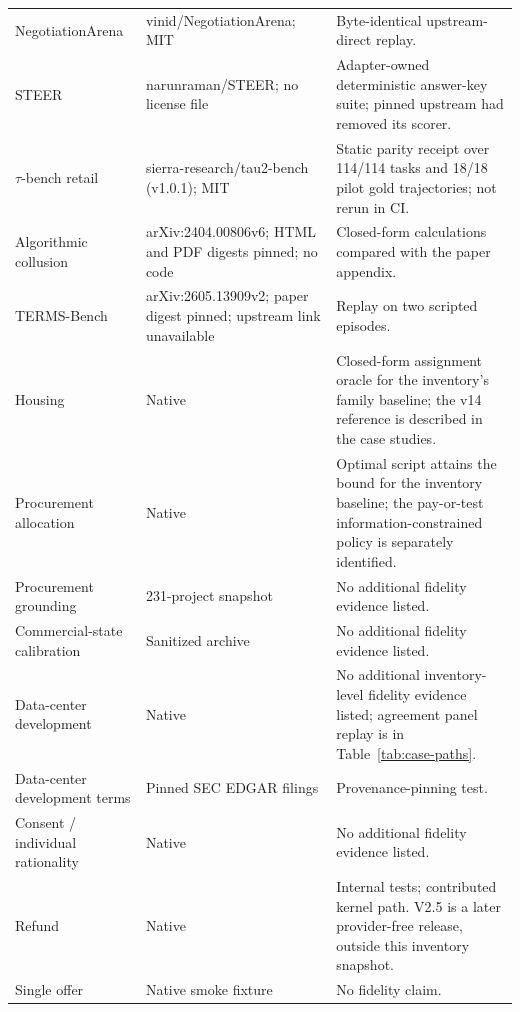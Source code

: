\begin{longtable}{@{}P{1.34in}P{2.22in}P{2.96in}@{}}
NegotiationArena \citep{bianchi2024negotiationarena} & vinid/NegotiationArena\newline{}; MIT & Byte-identical upstream-direct replay.\\
STEER \citep{raman2024steer} & narunraman/STEER\newline{}; no license file & Adapter-owned deterministic answer-key suite; pinned upstream had removed its scorer.\\
$\tau$-bench retail \citep{barres2025tau2} & sierra-research/tau2-bench\newline{} (v1.0.1); MIT & Static parity receipt over 114/114 tasks and 18/18 pilot gold trajectories; not rerun in CI.\\
Algorithmic collusion \citep{fish2024collusion} & arXiv:2404.00806v6; HTML and PDF digests pinned; no code & Closed-form calculations compared with the paper appendix.\\
TERMS-Bench \citep{zhang2026termsbench} & arXiv:2605.13909v2; paper digest pinned; upstream link unavailable & Replay on two scripted episodes.\\
Housing & Native & Closed-form assignment oracle for the inventory's family baseline; the v14 reference is described in the case studies.\\
Procurement allocation & Native & Optimal script attains the bound for the inventory baseline; the pay-or-test information-constrained policy is separately identified.\\
Procurement grounding & 231-project snapshot & No additional fidelity evidence listed.\\
Commercial-state calibration & Sanitized archive & No additional fidelity evidence listed.\\
Data-center development & Native & No additional inventory-level fidelity evidence listed; agreement panel replay is in Table~\ref{tab:case-paths}.\\
Data-center development terms & Pinned SEC EDGAR filings & Provenance-pinning test.\\
Consent / individual rationality & Native & No additional fidelity evidence listed.\\
Refund & Native & Internal tests; contributed kernel path. V2.5 is a later provider-free release, outside this inventory snapshot.\\
Single offer & Native smoke fixture & No fidelity claim.\\
\end{longtable}
\endgroup
